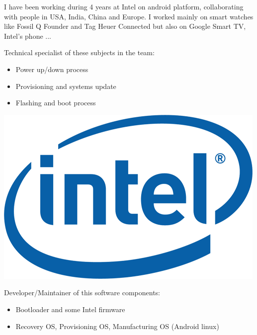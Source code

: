 \documentclass[letterpaper]{jm-cv} %
\begin{document}
\small{

  I have been working during 4 years at Intel on android platform, collaborating with people in USA, India, China and Europe. I worked mainly on smart watches like Fossil Q Founder and Tag Heuer Connected but also on Google Smart TV, Intel's phone ...

  \vspace{0.2cm}
  \begin{minipage}{.7\textwidth}
    {\footnotesize\color{maingray}\bullet} Technical specialist of these subjects in the team:
    \begin{itemize}
    \item[\color{mainblue}\faArrowRight] Power up/down process
    \item[\color{mainblue}\faArrowRight] Provisioning and systems update
    \item[\color{mainblue}\faArrowRight] Flashing and boot process
    \end{itemize}
  \end{minipage}%
  \begin{minipage}{.3\textwidth}
    \center
    \includegraphics[scale=0.13]{logo-intel.png}
  \end{minipage}
  \vspace{0.2cm}

  {\footnotesize\color{maingray}\bullet}  Developer/Maintainer of this software components:
  \vspace{-0.2cm}
  \begin{itemize}
  \item[\color{mainblue}\faArrowRight] Bootloader and some Intel firmware
  \item[\color{mainblue}\faArrowRight] Recovery OS, Provisioning OS, Manufacturing OS (Android linux)
  \end{itemize}

}
\end{document}
